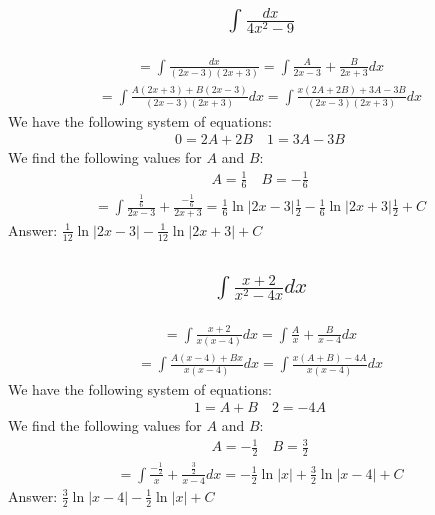 \documentclass{article}
\begin{document}
\subsection{
	\begin{align*}
		\int{\frac{dx}{4x^2 - 9}}
	\end{align*}
}
\begin{align*}
	= \int{\frac{dx}{(2x - 3)(2x + 3)}} = \int{\frac{A}{2x - 3} + \frac{B}{2x + 3}dx}
\end{align*}
\begin{align*}
	= \int{\frac{A(2x + 3) + B(2x - 3)}{(2x - 3)(2x + 3)}dx} = \int{\frac{x(2A + 2B) + 3A - 3B}{(2x - 3)(2x + 3)}dx}
\end{align*}
We have the following system of equations:
\begin{align*}
	0 = 2A + 2B \quad 1 = 3A - 3B
\end{align*}
We find the following values for $A$ and $B$: 
\begin{align*}
	A = \frac{1}{6} \quad B = -\frac{1}{6}
\end{align*}
\begin{align*}
	= \int{\frac{\frac{1}{6}}{2x - 3} + \frac{-\frac{1}{6}}{2x + 3}} = \frac{1}{6}\ln{|2x - 3|} \frac{1}{2} - \frac{1}{6} \ln{|2x + 3|} \frac{1}{2} + C
\end{align*}
Answer: $\frac{1}{12} \ln{|2x - 3|} - \frac{1}{12} \ln{|2x + 3|} + C$

\subsection{
	\begin{align*}
		\int{\frac{x + 2}{x^2 - 4x} dx}
	\end{align*}
}
\begin{align*}
	= \int{\frac{x + 2}{x(x - 4)}dx} = \int{\frac{A}{x} + \frac{B}{x - 4} dx}
\end{align*}
\begin{align*}
	= \int{\frac{A(x - 4) + Bx}{x(x - 4)}dx} = \int{\frac{x(A + B) - 4A}{x(x - 4)}dx}
\end{align*}
We have the following system of equations:
\begin{align*}
	1 = A + B \quad 2 = -4A
\end{align*}
We find the following values for $A$ and $B$:
\begin{align*}
	A = -\frac{1}{2} \quad B = \frac{3}{2}
\end{align*}
\begin{align*}
	= \int{\frac{-\frac{1}{2}}{x} + \frac{\frac{3}{2}}{x - 4}dx} = -\frac{1}{2}\ln{|x|} + \frac{3}{2}\ln{|x - 4|} + C
\end{align*}
Answer: $\frac{3}{2} \ln{|x - 4|} - \frac{1}{2} \ln{|x|} + C$
\end{document}
